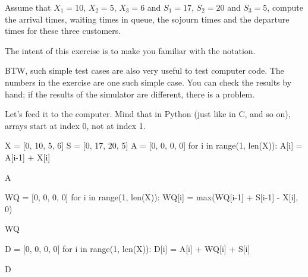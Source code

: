 \begin{exercise}
 Assume that $X_1=10$, $X_2=5$, $X_3=6$ and $S_1 = 17$,
    $S_2=20$ and $S_3=5$, compute the arrival times, waiting times in
    queue, the sojourn times and the departure times for these three
    customers.
  \begin{hint}
     The intent of this exercise is
      to make you familiar with the notation.

      BTW, such simple test cases are also very useful to test
      computer code. The numbers in the exercise are one such simple
      case. You can check the results by hand; if the results of the
      simulator are different, there is a problem.
    \end{hint}
    \begin{solution} Let's feed it to the computer. Mind that in Python (just like in C, and so on), arrays start at index 0, not at index 1. 
\begin{pyconsole}
X = [0, 10, 5, 6] 
S = [0, 17, 20, 5]
A = [0, 0, 0, 0]
for i in range(1, len(X)):
    A[i] = A[i-1] + X[i]

A

WQ = [0, 0, 0, 0]
for i in range(1, len(X)):
    WQ[i] = max(WQ[i-1] + S[i-1] - X[i], 0)

WQ

D = [0, 0, 0, 0]
for i in range(1, len(X)):
    D[i] = A[i] + WQ[i] + S[i]

D
\end{pyconsole}
      
    \end{solution}
  \end{exercise}

